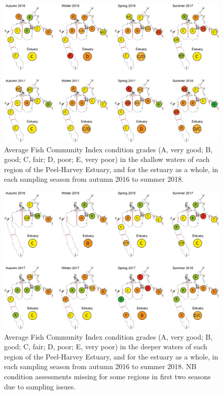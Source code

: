 \documentclass[
]{book}
\begin{document}
\begin{figure}
\includegraphics[width=1\linewidth]{images/fish_ecology/picture12} \caption{Average Fish Community Index condition grades (A, very good; B, good; C, fair; D, poor; E, very poor) in the shallow waters of each region of the Peel-Harvey Estuary, and for the estuary as a whole, in each sampling season from autumn 2016 to summer 2018.}\label{fig:fish-ecology-pic12}
\end{figure}

\begin{figure}
\includegraphics[width=1\linewidth]{images/fish_ecology/picture13} \caption{Average Fish Community Index condition grades (A, very good; B, good; C, fair; D, poor; E, very poor) in the deeper waters of each region of the Peel-Harvey Estuary, and for the estuary as a whole, in each sampling season from autumn 2016 to summer 2018. NB condition assessments missing for some regions in first two seasons due to sampling issues.}\label{fig:fish-ecology-pic13}
\end{figure}
\end{document}
